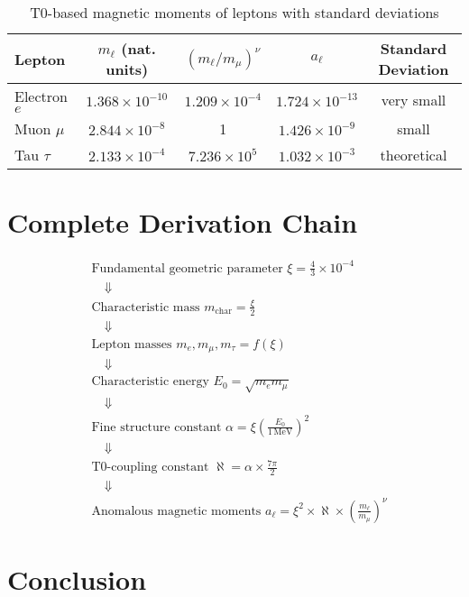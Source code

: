 \documentclass[12pt,a4paper]{article}
\newcommand{\xipar}{\xi}
\newcommand{\alphagem}{\alpha}
\newcommand{\nulep}{\nu}
\newcommand{\mchar}{m_{\text{char}}}
\newcommand{\Ezero}{E_0}
\begin{document}
	\begin{table}[H]
		\centering
		\begin{tabular}{@{}lcccc@{}}
			\toprule
			\textbf{Lepton} & \textbf{$m_\ell$ (nat. units)} & \textbf{$(m_\ell/m_\mu)^\nu$} & \textbf{$a_\ell$} & \textbf{Standard Deviation} \\ 
			\midrule
			Electron $e$ & $1{.}368 \times 10^{-10}$ & $1{.}209 \times 10^{-4}$ & $1{.}724 \times 10^{-13}$ & very small \\
			Muon $\mu$ & $2{.}844 \times 10^{-8}$ & 1 & $1{.}426 \times 10^{-9}$ & small \\
			Tau $\tau$ & $2{.}133 \times 10^{-4}$ & $7{.}236 \times 10^5$ & $1{.}032 \times 10^{-3}$ & theoretical \\
			\bottomrule
		\end{tabular}
		\caption{T0-based magnetic moments of leptons with standard deviations}
	\end{table}
	
	\section{Complete Derivation Chain}
	
	\begin{align}
		&\text{Fundamental geometric parameter } \xipar = \frac{4}{3} \times 10^{-4} \\
		&\quad \Downarrow \\
		&\text{Characteristic mass } \mchar = \frac{\xipar}{2} \\
		&\quad \Downarrow \\
		&\text{Lepton masses } m_e, m_\mu, m_\tau = f(\xipar) \\
		&\quad \Downarrow \\
		&\text{Characteristic energy } \Ezero = \sqrt{m_e m_\mu} \\
		&\quad \Downarrow \\
		&\text{Fine structure constant } \alphagem = \xipar \left(\frac{\Ezero}{1\,\text{MeV}}\right)^2 \\
		&\quad \Downarrow \\
		&\text{T0-coupling constant } \aleph = \alphagem \times \frac{7\pi}{2} \\
		&\quad \Downarrow \\
		&\text{Anomalous magnetic moments } a_\ell = \xipar^2 \times \aleph \times \left(\frac{m_\ell}{m_\mu}\right)^\nulep
	\end{align}
	
	\section{Conclusion}
	
\end{document}
